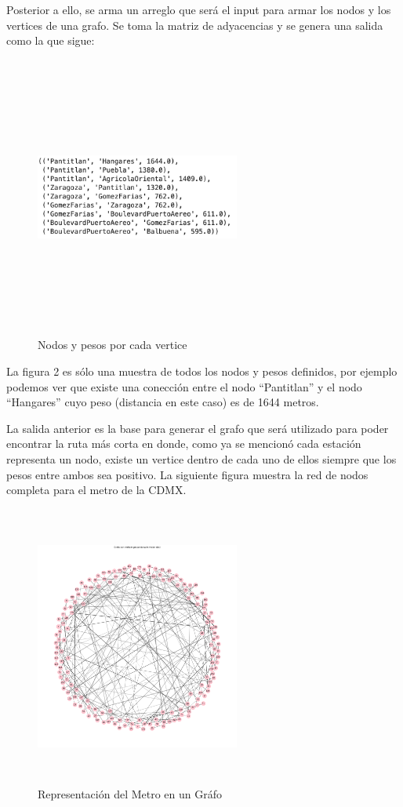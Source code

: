 \documentclass[
]{article}
\begin{document}
Posterior a ello, se arma un arreglo que será el input para armar los
nodos y los vertices de una grafo. Se toma la matriz de adyacencias y se
genera una salida como la que sigue:

\begin{figure}
\centering
\includegraphics[width=0.6\textwidth,height=3.64583in]{Imagenes/input_nodos_vertices.png}
\caption{Nodos y pesos por cada vertice}
\end{figure}

La figura 2 es sólo una muestra de todos los nodos y pesos definidos,
por ejemplo podemos ver que existe una conección entre el nodo
``Pantitlan'' y el nodo ``Hangares'' cuyo peso (distancia en este caso)
es de 1644 metros.

La salida anterior es la base para generar el grafo que será utilizado
para poder encontrar la ruta más corta en donde, como ya se mencionó
cada estación representa un nodo, existe un vertice dentro de cada uno
de ellos siempre que los pesos entre ambos sea positivo. La siguiente
figura muestra la red de nodos completa para el metro de la CDMX.

\begin{figure}
\centering
\includegraphics[width=0.6\textwidth,height=3.64583in]{Imagenes/Grafo_v1.png}
\caption{Representación del Metro en un Gráfo}
\end{figure}
\end{document}
